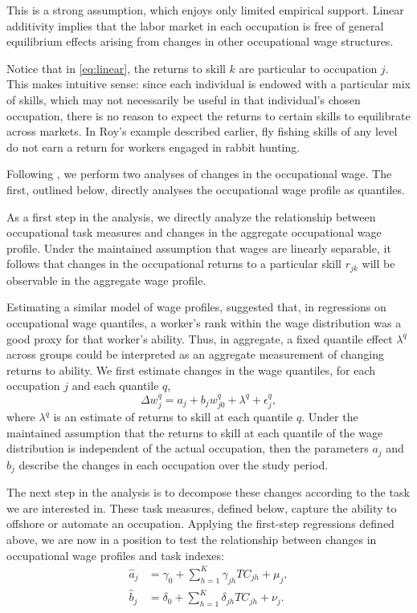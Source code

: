 This is a strong assumption, which enjoys only limited empirical support. Linear additivity implies that the labor market in each occupation is free of general equilibrium effects arising from changes in other occupational wage structures.

Notice that in \eqref{eq:linear}, the returns to skill $k$ are particular to occupation $j$. This makes intuitive sense: since each individual is endowed with a particular mix of skills, which may not necessarily be useful in that individual's chosen occupation, there is no reason to expect the returns to certain skills to equilibrate across markets. In Roy's example described earlier, fly fishing skills of any level do not earn a return for workers engaged in rabbit hunting. %

Following \citet{Firpo2011}, we perform two analyses of changes in the occupational wage. The first, outlined below, directly analyses the occupational wage profile as quantiles.

As a first step in the analysis, we directly analyze the relationship between occupational task measures and changes in the aggregate occupational wage profile. Under the maintained assumption that wages are linearly separable, it follows that changes in the occupational returns to a particular skill $r_{jk}$ will be observable in the aggregate wage profile.

Estimating a similar model of wage profiles, \citet{Juhn1993} suggested that, in regressions on occupational wage quantiles, a worker's rank within the wage distribution was a good proxy for that worker's ability. Thus, in aggregate, a fixed quantile effect $\lambda^q$ across groups could be interpreted as an aggregate measurement of changing returns to ability. We first estimate changes in the wage quantiles, for each occupation $j$ and each quantile $q$,
\begin{equation} 
  \Delta w_j^q = a_j + b_jw_{j0}^q + \lambda^q + \epsilon^q_j, \label{eq:quantiles}
\end{equation}
where $\lambda^q$ is an estimate of returns to skill at each quantile $q$. Under the maintained assumption that the returns to skill at each quantile of the wage distribution is independent of the actual occupation, then the parameters $a_j$ and $b_j$ describe the changes in each occupation over the study period.

The next step in the analysis is to decompose these changes according to the task we are interested in. These task measures, defined below, capture the ability to offshore or automate an occupation. Applying the first-step regressions defined above, we are now in a position to test the relationship between changes in occupational wage profiles and task indexes:
\begin{align}
  \hat{a}_j &= \gamma_0 + \sum_{h=1}^K\gamma_{jh}TC_{jh} + \mu_j, \label{eq:aeq} \\
  \hat{b}_j &= \delta_0 + \sum_{h=1}^K\delta_{jh}TC_{jh} + \nu_j. \label{eq:beq}
\end{align}


